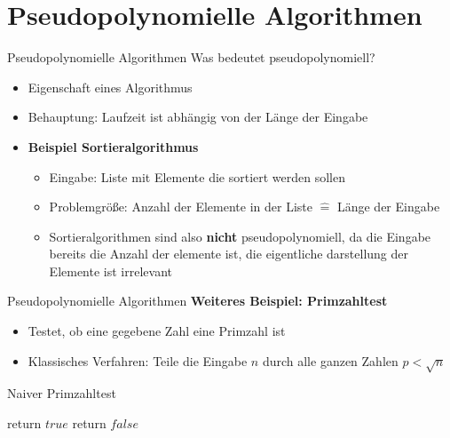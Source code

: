 \section{Pseudopolynomielle Algorithmen}

\begin{frame}{Pseudopolynomielle Algorithmen}
Was bedeutet pseudopolynomiell?

\begin{itemize}
	\item Eigenschaft eines Algorithmus
	
	\item Behauptung: Laufzeit ist abhängig von der Länge der Eingabe
	\item \textbf{Beispiel Sortieralgorithmus}
	\begin{itemize}
		\item Eingabe: Liste mit Elemente die sortiert werden sollen
		\item Problemgröße: Anzahl der Elemente in der Liste $\widehat{=}$ Länge der Eingabe
		\item	Sortieralgorithmen sind also \textbf{nicht} pseudopolynomiell, da die Eingabe bereits die Anzahl der elemente ist, die eigentliche darstellung der Elemente ist irrelevant
	\end{itemize}

\end{itemize}


\end{frame}




\begin{frame}{Pseudopolynomielle Algorithmen}
\textbf{Weiteres Beispiel: Primzahltest}

\begin{itemize}
\item
Testet, ob eine gegebene Zahl eine Primzahl ist
\item
Klassisches Verfahren: Teile die Eingabe $n$ durch alle ganzen Zahlen $p < \sqrt{n}$
\end{itemize}

\begin{algorithm}[H]
\caption{Naiver Primzahltest}
    \begin{algorithmic}
                  	\State return $true$
            \Else
                  	\State return $false$
            \EndIf
            \EndFor
        \EndFunction
    \end{algorithmic}
\end{algorithm}
\end{frame}

